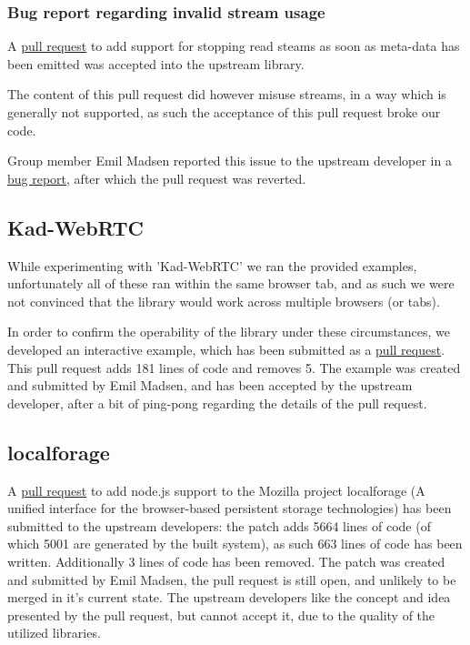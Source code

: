 \subsubsection{Bug report regarding invalid stream usage}
A \href{https://github.com/leetreveil/musicmetadata/pull/116}{pull request} to
add support for stopping read steams as soon as meta-data has been emitted was
accepted into the upstream library.

The content of this pull request did however misuse streams, in a way which is
generally not supported, as such the acceptance of this pull request broke our
code.

Group member Emil Madsen reported this issue to the upstream developer in a
\href{https://github.com/leetreveil/musicmetadata/issues/120}{bug report},
after which the pull request was reverted.

\subsection{Kad-WebRTC}
\label{subsec:appendix-kad-webrtc}
While experimenting with 'Kad-WebRTC' we ran the provided examples, 
unfortunately all of these ran within the same browser tab, and as such we were
not convinced that the library would work across multiple browsers (or tabs).

In order to confirm the operability of the library under these circumstances,
we developed an interactive example, which has been submitted as a 
\href{https://github.com/kadtools/kad-webrtc/pull/11}{pull request}. This pull
request adds 181 lines of code and removes 5.
\newline\newline
The example was created and submitted by Emil Madsen, and has been accepted by
the upstream developer, after a bit of ping-pong regarding the details of the 
pull request.

\subsection{localforage}
\label{subsec:appendix-localforage}
A \href{https://github.com/mozilla/localForage/pull/551}{pull request} to add 
node.js support to the Mozilla project localforage (A unified interface for 
the browser-based persistent storage technologies) has been submitted to the
upstream developers: the patch adds 5664 lines of code (of which 5001 are 
generated by the built system), as such 663 lines of code has been written.
Additionally 3 lines of code has been removed.
\newline\newline
The patch was created and submitted by Emil Madsen, the pull request is still
open, and unlikely to be merged in it's current state. The upstream developers
like the concept and idea presented by the pull request, but cannot accept it,
due to the quality of the utilized libraries.


